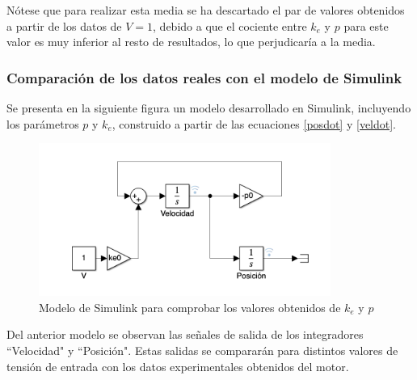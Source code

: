 \documentclass[a4paper, 12pt]{article}
\begin{document}
Nótese que para realizar esta media se ha descartado el par de valores obtenidos a partir de los datos de $V = 1$, debido a que el cociente entre $k_e$ y $p$ para este valor es muy inferior al resto de resultados, lo que perjudicaría a la media.

\subsubsection{Comparación de los datos reales con el modelo de Simulink}
Se presenta en la siguiente figura un modelo desarrollado en Simulink, incluyendo los parámetros $p$ y $k_e$, construido a partir de las ecuaciones \ref{posdot} y \ref{veldot}. 
\begin{figure}[h!]
	\centering
	\includegraphics[height=5cm]{figs/pykesimulink}
	\caption{Modelo de Simulink para comprobar los valores obtenidos de $k_e$ y $p$}
\end{figure}

Del anterior modelo se observan las señales de salida de los integradores ``Velocidad" y ``Posición".  Estas salidas se compararán para distintos valores de tensión de entrada con los datos experimentales obtenidos del motor. \\
\end{document}
